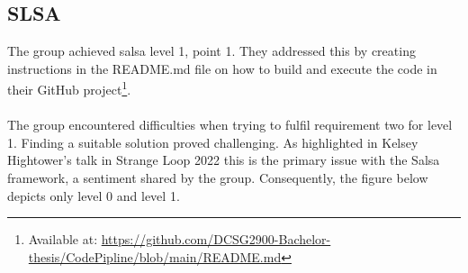 \subsection{SLSA}

The group achieved salsa level 1, point 1. They addressed this by creating instructions in the README.md file on how to build and execute the code in their GitHub project\footnote{Available at: \url{https://github.com/DCSG2900-Bachelor-thesis/CodePipline/blob/main/README.md}}. 
\\~\\
The group encountered difficulties when trying to fulfil requirement two for level 1. Finding a suitable solution proved challenging. As highlighted in Kelsey Hightower's talk in Strange Loop 2022 \cite{The-Secure-Software-Supply-Chain} this is the primary issue with the Salsa framework, a sentiment shared by the group. Consequently, the figure below depicts only level 0 and level 1.



